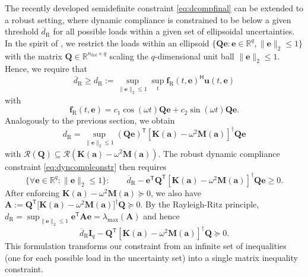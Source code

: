 \documentclass[preprint,3p]{elsarticle}
\newcommand{\T}{^{\mathsf T}}
\newcommand{\TC}{^{\mathsf H}}
\newcommand{\ndof}{n_\mathrm{dof}}
\newcommand{\R}{\mathrm{R}}
\newcommand{\range}[1]{\ensuremath{\mathcal{R}\!\left(#1\right)}}
\numberwithin{equation}{section}
\begin{document}
The recently developed semidefinite constraint \eqref{eq:dcompfinal} can be extended to a robust setting, where dynamic compliance is constrained to be below a given threshold $\overline{d}_\R$ for all possible loads within a given set of ellipsoidal uncertainties. In the spirit of \citep{BenTal1997}, we restrict the loads within an ellipsoid $\{\mathbf{Q}\mathbf{e}: \mathbf{e} \in \mathbb{R}^{q}, \lVert\mathbf{e}\rVert_2 \le 1\}$ with the matrix $\mathbf{Q} \in \mathbb{R}^{\ndof \times q}$ scaling the $q$-dimensional unit ball $\lVert \mathbf{e}\rVert_2 \le 1$. Hence, we require that
%
\begin{equation}\label{eq:dyncomplconstr}
  \overline{d}_\R \ge d_\R := \sup_{\lVert \mathbf{e} \rVert_2 \le 1} \sup_{t} \mathbf{f}_\R (t, \mathbf{e})\TC \mathbf{u}(t, \mathbf{e})
\end{equation}
%
with
%
\begin{equation}\label{eq:forcerobust}
  \mathbf{f}_\R (t, \mathbf{e}) = c_1 \cos(\omega t) \mathbf{Q} \mathbf{e} + c_2 \sin(\omega t) \mathbf{Q} \mathbf{e}.
\end{equation}
%
Analogously to the previous section, we obtain
%
\begin{equation}
  d_\R = \sup_{\lVert\mathbf{e}\rVert_2 \le 1} \left( \mathbf{Q} \mathbf{e}\right)\T \left[ \mathbf{K}(\mathbf{a}) - \omega^2 \mathbf{M}(\mathbf{a}) \right]^\dagger \mathbf{Q} \mathbf{e}
\end{equation}
%
with $\range{\mathbf{Q}} \subseteq \range{\mathbf{K}(\mathbf{a}) - \omega^2 \mathbf{M}(\mathbf{a})}$. The robust dynamic compliance constraint \eqref{eq:dyncomplconstr} then requires 
%
\begin{equation}
\{\forall\mathbf{e} \in \mathbb{R}^q: \lVert\mathbf{e}\rVert_2 \le 1\}: \qquad\overline{d}_\R - \mathbf{e}\T\mathbf{Q}\T \left[ \mathbf{K}(\mathbf{a}) - \omega^2 \mathbf{M}(\mathbf{a})\right]^\dagger \mathbf{Q} \mathbf{e} \ge 0.
\end{equation}
%
After enforcing \(\mathbf{K}(\mathbf{a})-\omega^2\mathbf{M}(\mathbf{a})\succeq0\), we also have $\mathbf{A}:=\mathbf{Q}\T\!\big[\mathbf{K}(\mathbf{a})-\omega^2\mathbf{M}(\mathbf{a})\big]^\dagger\mathbf{Q}\succeq0$. By the Rayleigh-Ritz principle, $d_\R=\sup_{\|\mathbf{e}\|_2\le 1}\mathbf{e}\T\mathbf{A}\mathbf{e}=\lambda_{\max}(\mathbf{A})$ and hence
%
\begin{equation}\label{eq:robust_dyncompl_sphere}
  \overline{d}_\R \mathbf{I}_q - \mathbf{Q}\T \left[ \mathbf{K}(\mathbf{a}) - \omega^2 \mathbf{M}(\mathbf{a})\right]^\dagger \mathbf{Q} \succeq 0.
\end{equation}
%
This formulation transforms our constraint from an infinite set of inequalities (one for each possible load in the uncertainty set) into a single matrix inequality constraint.
\end{document}
